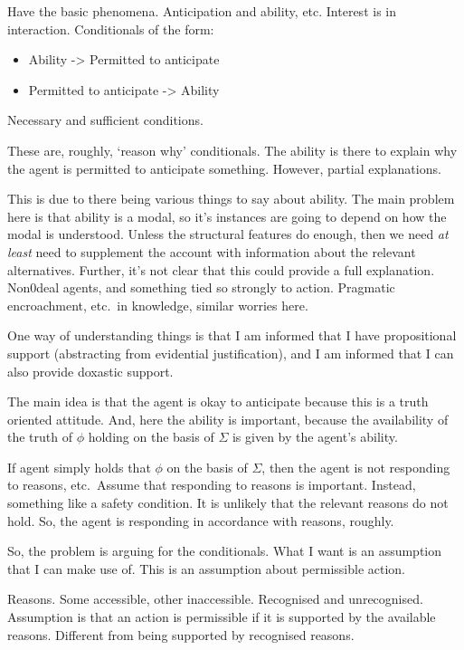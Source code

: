 \documentclass[10pt]{article}
\begin{document}
{
  \color{red}
  Have the basic phenomena.
  Anticipation and ability, etc.
  Interest is in interaction.
  Conditionals of the form:
  \begin{itemize}
  \item Ability -> Permitted to anticipate
  \item Permitted to anticipate -> Ability
  \end{itemize}
  Necessary and sufficient conditions.

  These are, roughly, `reason why' conditionals.
  The ability is there to explain why the agent is permitted to anticipate something.
  However, partial explanations.

  This is due to there being various things to say about ability.
  The main problem here is that ability is a modal, so it's instances are going to depend on how the modal is understood.
  Unless the structural features do enough, then we need \emph{at least} need to supplement the account with information about the relevant alternatives.
  Further, it's not clear that this could provide a full explanation.
  Non0deal agents, and something tied so strongly to action.
  Pragmatic encroachment, etc.\ in knowledge, similar worries here.


  {
    \color{blue}
    One way of understanding things is that I am informed that I have propositional support (abstracting from evidential justification), and I am informed that I can also provide doxastic support.

    The main idea is that the agent is okay to anticipate because this is a truth oriented attitude.
    And, here the ability is important, because the availability of the truth of \(\phi\) holding on the basis of \(\Sigma\) is given by the agent's ability.

    If agent simply holds that \(\phi\) on the basis of \(\Sigma\), then the agent is not responding to reasons, etc.\
    Assume that responding to reasons is important.
    Instead, something like a safety condition.
    It is unlikely that the relevant reasons do not hold.
    So, the agent is responding in accordance with reasons, roughly.
  }

  {
    \color{red}
    So, the problem is arguing for the conditionals.
    What I want is an assumption that I can make use of.
    This is an assumption about permissible action.

    Reasons.
    Some accessible, other inaccessible.
    Recognised and unrecognised.
    Assumption is that an action is permissible if it is supported by the available reasons.
    Different from being supported by recognised reasons.

}}
\end{document}
